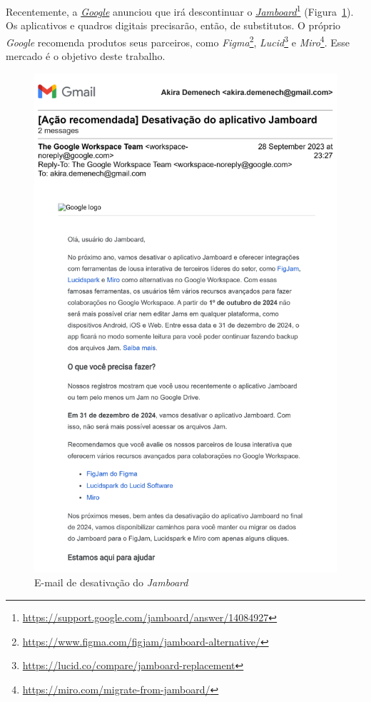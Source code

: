 \documentclass[twocolumn,12pt]{article}
\title{\brand{Jellypanel}}
\newcommand{\brand}[1]{\textit{#1}}
\begin{document}
	
	\maketitle
	
	

	\tableofcontents
	\listoffigures
	
	Recentemente, a \href{https://www.google.com.br/}{\brand{Google}} anunciou que irá descontinuar o \href{https://jamboard.google.com/}{\brand{Jamboard}}\footnote{\url{https://support.google.com/jamboard/answer/14084927}} (Figura~\ref{fig:gmail}). 
	Os aplicativos e quadros digitais precisarão, então, de substitutos.
	O próprio \brand{Google} recomenda produtos seus parceiros, como  \brand{Figma}\footnote{\url{https://www.figma.com/figjam/jamboard-alternative/}}, \brand{Lucid}\footnote{\url{https://lucid.co/compare/jamboard-replacement}} e \brand{Miro}\footnote{\url{https://miro.com/migrate-from-jamboard/}}.   				
	Esse mercado é o objetivo deste trabalho. 
	
	\begin{figure}[htpb]
		\caption{E-mail de desativação do \brand{Jamboard}}
		\label{fig:gmail}
		\includegraphics[width=\linewidth]{jamboard.pdf}
	\end{figure}

	
	
\end{document}
